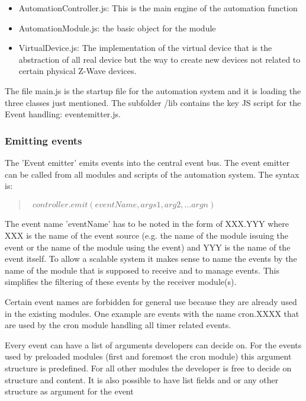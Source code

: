 \begin{itemize}
\item AutomationController.js: This is the main engine of the automation function
\item AutomationModule.js: the basic object for the module
\item VirtualDevice.js: The implementation of the virtual device that is the abstraction of all real device but the way to create new devices not related to certain physical Z-Wave devices.
\end{itemize}


The file main.js is the startup file for the automation system and it is loading the three 
classes just mentioned. The subfolder /lib contains the key JS script for the Event handling: eventemitter.js.

\subsubsection{Emitting events}

The 'Event emitter' emits events into the central event bus. The event emitter can be called from 
all modules and scripts of the automation system. The syntax is:

\begin{quote}
{\tt  
$controller.emit(eventName, args1,arg2,...argn)$
}
\end{quote}

The event name 'eventName' has to be noted in the form of XXX.YYY where XXX is the name 
of the event source (e.g. the name of the module issuing the event or the name of the 
module using the event) and YYY is the name of the event itself.  To allow a scalable 
system it makes sense to name the events by the name of the module that is supposed to 
receive and to manage events. This simplifies the filtering of these events by the 
receiver module(s).

Certain event names are forbidden for general use because they are already used in the 
existing modules. One example are events with the name cron.XXXX that are used by the 
cron module handling all timer related events.

Every event can have a list of arguments developers can decide on. For the events used by 
preloaded modules (first and foremost the cron module) this argument structure is 
predefined. For all other modules the developer is free to decide on structure and content. It is also 
possible to have list fields and or any other structure as argument for the event

